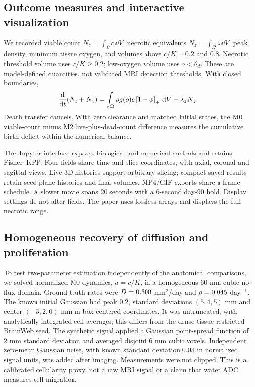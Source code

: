 \subsection{Outcome measures and interactive visualization}
We recorded viable count $N_c=\int_\Omega c\,\dd V$, necrotic equivalents $N_z=\int_\Omega z\,\dd V$, peak density, minimum tissue oxygen, and volumes above $c/K=0.2$ and 0.8. Necrotic threshold volume uses $z/K\geq0.2$; low-oxygen volume uses $o<\theta_d$. These are model-defined quantities, not validated MRI detection thresholds. With closed boundaries,
\begin{equation}
 \frac{\mathrm{d}}{\mathrm{d} t}(N_c+N_z)=\int_\Omega\rho g(o)c\left[1-\phi\right]_{+}\,\mathrm{d} V-\lambda_zN_z .\label{eq:balance}
\end{equation}
Death transfer cancels. With zero clearance and matched initial states, the M0 viable-count minus M2 live-plus-dead-count difference measures the cumulative birth deficit within the numerical balance.

The Jupyter interface exposes biological and numerical controls and retains Fisher--KPP. Four fields share time and slice coordinates, with axial, coronal and sagittal views. Live 3D histories support arbitrary slicing; compact saved results retain seed-plane histories and final volumes. MP4/GIF exports share a frame schedule. A slower movie spans 20 seconds with a 6-second day-90 hold. Display settings do not alter fields. The paper uses lossless arrays and displays the full necrotic range.

\subsection{Homogeneous recovery of diffusion and proliferation}\label{sec:recovery_methods}
To test two-parameter estimation independently of the anatomical comparisons, we solved normalized M0 dynamics, $u=c/K$, in a homogeneous 60 mm cubic no-flux domain. Ground-truth rates were $D=0.300$ mm$^2$/day and $\rho=0.045$ day$^{-1}$. The known initial Gaussian had peak 0.2, standard deviations $(5,4,5)$ mm and center $(-3,2,0)$ mm in box-centered coordinates. It was untruncated, with analytically integrated cell averages; this differs from the dense tissue-restricted BrainWeb seed. The synthetic signal applied a Gaussian point-spread function of 2 mm standard deviation and averaged disjoint 6 mm cubic voxels. Independent zero-mean Gaussian noise, with known standard deviation 0.03 in normalized signal units, was added after imaging. Measurements were not clipped. This is a calibrated cellularity proxy, not a raw MRI signal or a claim that water ADC measures cell migration.

